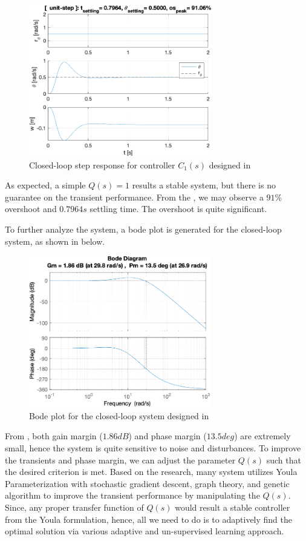 \documentclass{tron}
\begin{document}
\begin{figure}[H]
	\centering
	\includegraphics[height=250px]{../matlab/output/p3/step_response_unit-step}
	\caption{Closed-loop step response for controller $C_1(s)$ designed in }
	\label{fig:unit-step}
\end{figure}

As expected, a simple $Q(s)=1$ results a stable system, but there is no guarantee on the transient performance. From the , we may observe a $91\%$ overshoot and $0.7964\unit{s}$ settling time. The overshoot is quite significant. 

To further analyze the system, a bode plot is generated for the closed-loop system, as shown in  below.

\begin{figure}[H]
	\centering
	\includegraphics[height=250px]{../matlab/output/p3/bode_plot_r2theta}
	\caption{Bode plot for the closed-loop system designed in }
	\label{fig:bode}
\end{figure}

From , both gain margin ($1.86 \unit{dB}$) and phase margin ($13.5\unit{deg}$) are extremely small, hence the system is quite sensitive to noise and disturbances. To improve the transients and phase margin, we can adjust the parameter $Q(s)$ such that the desired criterion is met. Based on the research, many system utilizes Youla Parameterization with stochastic gradient descent, graph theory, and genetic algorithm to improve the transient performance by manipulating the $Q(s)$. Since, any proper transfer function of $Q(s)$ would result a stable controller from the Youla formulation, hence, all we need to do is to adaptively find the optimal solution via various adaptive and un-supervised learning approach.
\end{document}

